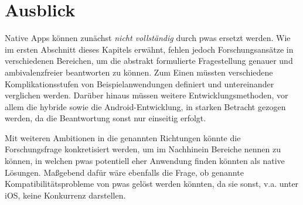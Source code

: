 \section{Ausblick}
Native Apps können zunächst \textit{nicht vollständig} durch \acp{pwa} ersetzt werden. Wie im ersten Abschnitt dieses Kapitels erwähnt, fehlen jedoch Forschungsansätze in verschiedenen Bereichen, um die abstrakt formulierte Fragestellung genauer und ambivalenzfreier beantworten zu können. Zum Einen müssten verschiedene Komplikationsstufen von Beispielanwendungen definiert und untereinander verglichen werden. Darüber hinaus müssen weitere Entwicklungsmethoden, vor allem die hybride sowie die Android-Entwicklung, in starken Betracht gezogen werden, da die Beantwortung sonst nur einseitig erfolgt.

Mit weiteren Ambitionen in die genannten Richtungen könnte die Forschungsfrage konkretisiert werden, um im Nachhinein Bereiche nennen zu können, in welchen \acp{pwa} potentiell eher Anwendung finden könnten als native Lösungen. Maßgebend dafür wäre ebenfalls die Frage, ob genannte Kompatibilitätsprobleme von \acp{pwa} gelöst werden könnten, da sie sonst, v.a. unter iOS, keine Konkurrenz darstellen.